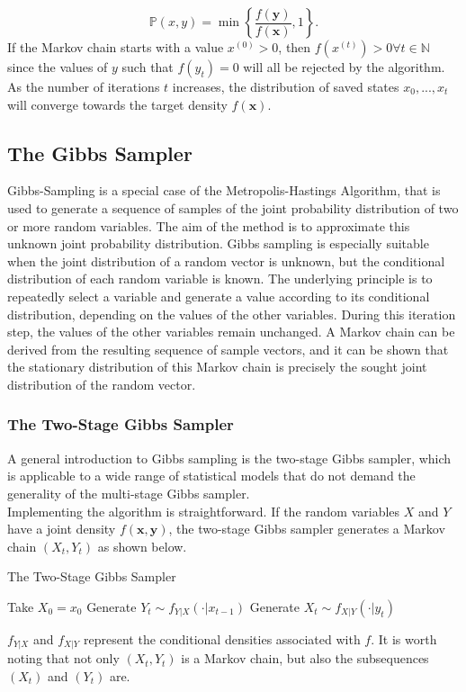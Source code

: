 \documentclass[12pt]{book}
\begin{document}
\begin{equation*}
     \mathbb{P}\left(x,y\right) = \min\left\lbrace\frac{f\left(\pmb{y}\right)}{f\left(\pmb{x}\right)}, 1\right\rbrace.
\end{equation*}
If the Markov chain starts with a value $x^{(0)} > 0$, then $f\left(x^{(t)}\right) > 0 \forall t\in\mathbb{N}$ since the values of $y$ such that $f\left(y_t\right) = 0$ will all be rejected by the algorithm. As the number of iterations $t$ increases, the distribution of saved states $x_0,...,x_t$ will converge towards the target density $f(\pmb{x})$\autocite[Cf.][]{robert2013monte}.
\subsection{The Gibbs Sampler}
Gibbs-Sampling is a special case of the Metropolis-Hastings Algorithm, that is used to generate a sequence of samples of the joint probability distribution of two or more random variables. The aim of the method is to approximate this unknown joint probability distribution. Gibbs sampling is especially suitable when the joint distribution of a random vector is unknown, but the conditional distribution of each random variable is known. The underlying principle is to repeatedly select a variable and generate a value according to its conditional distribution, depending on the values of the other variables. During this iteration step, the values of the other variables remain unchanged. A Markov chain can be derived from the resulting sequence of sample vectors, and it can be shown that the stationary distribution of this Markov chain is precisely the sought joint distribution of the random vector.
\subsubsection{The Two-Stage Gibbs Sampler}
A general introduction to Gibbs sampling is the two-stage Gibbs sampler, which is applicable to a wide range of statistical models that do not demand the generality of the multi-stage Gibbs sampler. \\
Implementing the algorithm is straightforward. If the random variables $X$ and $Y$ have a joint density $f\left(\pmb{x},\pmb{y}\right)$, the two-stage Gibbs sampler generates a Markov chain $\left(X_t,Y_t\right)$ as shown below.
\begin{algorithm}
\caption{The Two-Stage Gibbs Sampler}
\begin{algorithmic}[1]
\Statex Take $X_0=x_0$
    \State Generate $Y_t\sim f_{Y|X}\left(\cdot|x_{t-1}\right)$
    \State Generate $X_t\sim f_{X|Y}\left(\cdot|y_t\right)$
    \EndFor
\end{algorithmic}
\end{algorithm} 
$f_{Y|X}$ and $f_{X|Y}$ represent the conditional densities associated with $f$. It is worth noting that not only $\left(X_t,Y_t\right)$ is a Markov chain, but also the subsequences $\left(X_t\right)$ and $\left(Y_t\right)$ are. 
\end{document}
